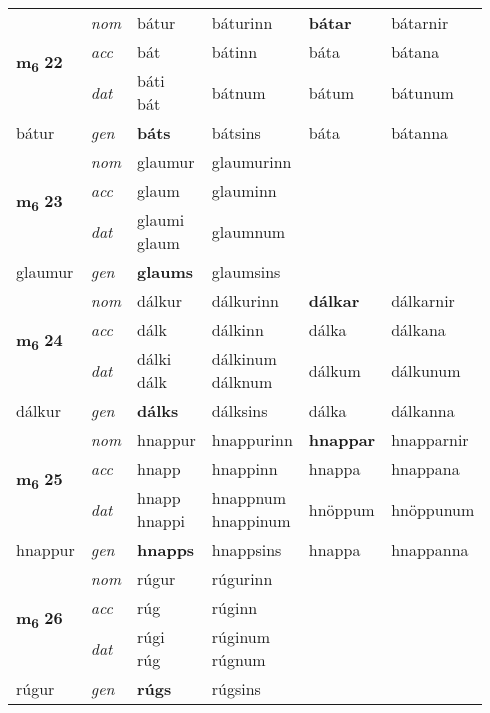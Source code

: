 \begin{longtable}[l]{X>{\footnotesize\itshape}XXXXX}
\multirow{3}{*}{{{\textbf{m{\textsubscript{6}}} \Large{\textbf{22}}}}} & nom & bátur & báturinn & \textbf{bátar} & bátarnir \\*
 & acc & bát & bátinn & báta & bátana \\*
 & dat & \specialcell{báti\\ bát} & bátnum & bátum & bátunum \\*
 {\footnotesize{bátur}} & gen & \textbf{báts} & bátsins & báta & bátanna \\
\cmidrule{1-6}

\multirow{3}{*}{{{\textbf{m{\textsubscript{6}}} \Large{\textbf{23}}}}} & nom & glaumur & glaumurinn & \textbf{} &  \\*
 & acc & glaum & glauminn &  &  \\*
 & dat & \specialcell{glaumi\\ glaum} & glaumnum &  &  \\*
 {\footnotesize{glaumur}} & gen & \textbf{glaums} & glaumsins &  &  \\
\cmidrule{1-6}

\multirow{3}{*}{{{\textbf{m{\textsubscript{6}}} \Large{\textbf{24}}}}} & nom & dálkur & dálkurinn & \textbf{dálkar} & dálkarnir \\*
 & acc & dálk & dálkinn & dálka & dálkana \\*
 & dat & \specialcell{dálki\\ dálk} & \specialcell{dálkinum\\ dálknum} & dálkum & dálkunum \\*
 {\footnotesize{dálkur}} & gen & \textbf{dálks} & dálksins & dálka & dálkanna \\


\multirow{3}{*}{{{\textbf{m{\textsubscript{6}}} \Large{\textbf{25}}}}} & nom & hnappur & hnappurinn & \textbf{hnappar} & hnapparnir \\*
 & acc & hnapp & hnappinn & hnappa & hnappana \\*
 & dat & \specialcell{hnapp\\ hnappi} & \specialcell{hnappnum\\ hnappinum} & hnöppum & hnöppunum \\*
 {\footnotesize{hnappur}} & gen & \textbf{hnapps} & hnappsins & hnappa & hnappanna \\
\cmidrule{1-6}

\multirow{3}{*}{{{\textbf{m{\textsubscript{6}}} \Large{\textbf{26}}}}} & nom & rúgur & rúgurinn & \textbf{} &  \\*
 & acc & rúg & rúginn &  &  \\*
 & dat & \specialcell{rúgi\\ rúg} & \specialcell{rúginum\\ rúgnum} &  &  \\*
 {\footnotesize{rúgur}} & gen & \textbf{rúgs} & rúgsins &  &  \\
\cmidrule{1-6}


\end{longtable}
